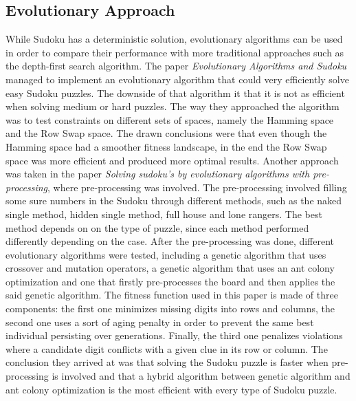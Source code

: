 \subsection{Evolutionary Approach}
{While Sudoku has a deterministic solution, evolutionary algorithms can be used in order to compare their performance with more traditional approaches such as the depth-first search algorithm. The paper \textit{Evolutionary Algorithms and Sudoku} managed to implement an evolutionary algorithm that could very efficiently solve easy Sudoku puzzles\cite{Moraglio}. The downside of that algorithm it that it is not as efficient when solving medium or hard puzzles.
The way they approached the algorithm was to test constraints on different sets of spaces, namely the Hamming space and the Row Swap space. The drawn conclusions were that even though the Hamming space had a smoother fitness landscape, in the end the Row Swap space was more efficient and produced more optimal results.}
{\newline}
{\newline Another approach was taken in the paper \textit{Solving sudoku’s by evolutionary algorithms with pre-processing}, where pre-processing was involved\cite{Amil2019}. The pre-processing involved filling some sure numbers in the Sudoku through different methods, such as the naked single method, hidden single method, full house and lone rangers. The best method depends on on the type of puzzle, since each method performed differently depending on the case.
After the pre-processing was done, different evolutionary algorithms were tested, including a genetic algorithm that uses crossover and mutation operators, a genetic algorithm that uses an ant colony optimization and one that firstly pre-processes the board and then applies the said genetic algorithm. The fitness function used in this paper is made of three components: the first one minimizes missing digits into rows and columns, the second one uses a sort of aging penalty in order to prevent the same best individual persisting over generations. Finally, the third one penalizes violations where a candidate digit conflicts with a given clue in its row or column.
The conclusion they arrived at was that solving the Sudoku puzzle is faster when pre-processing is involved and that a hybrid algorithm between genetic algorithm and ant colony optimization is the most efficient with every type of Sudoku puzzle.  }
{\newline}
